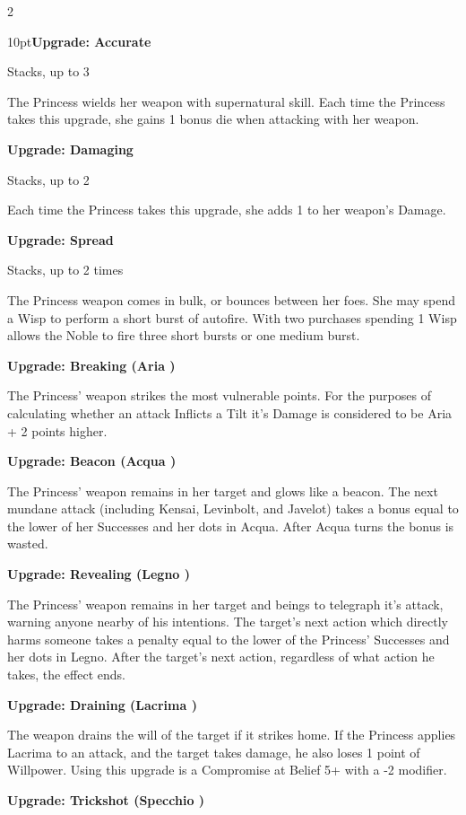 \begin{multicols}{2}
\begin{myindentpar}{10pt}\textbf{Upgrade: Accurate}

Stacks, up to 3

The Princess wields her weapon with supernatural skill. Each time the Princess takes this upgrade, she gains 1 bonus die when attacking with her weapon.

\textbf{Upgrade: Damaging}

Stacks, up to 2

Each time the Princess takes this upgrade, she adds 1 to her weapon’s Damage. 

\textbf{Upgrade: Spread}

Stacks, up to 2 times

The Princess weapon comes in bulk, or bounces between her foes. She may spend a Wisp to perform a short burst of autofire. With two purchases spending 1 Wisp allows the Noble to fire three short bursts or one medium burst. 

\textbf{Upgrade: Breaking (Aria \textbullet\textbullet)}

The Princess' weapon strikes the most vulnerable points. For the purposes of calculating whether an attack Inflicts a Tilt it's Damage is considered to be Aria + 2 points higher. 

\textbf{Upgrade: Beacon (Acqua \textbullet\textbullet)}

The Princess' weapon remains in her target and glows like a beacon. The next mundane attack (including Kensai, Levinbolt, and Javelot) takes a bonus equal to the lower of her Successes and her dots in Acqua. After Acqua turns the bonus is wasted. 

\textbf{Upgrade: Revealing (Legno \textbullet\textbullet)}

The Princess' weapon remains in her target and beings to telegraph it's attack, warning anyone nearby of his intentions. The target's next action which directly harms someone takes a penalty equal to the lower of the Princess' Successes and her dots in Legno. After the target's next action, regardless of what action he takes, the effect ends. 

\textbf{Upgrade: Draining (Lacrima \textbullet\textbullet)}

The weapon drains the will of the target if it strikes home. If the Princess applies Lacrima to an attack, and the target takes damage, he also loses 1 point of Willpower. Using this upgrade is a Compromise at Belief 5+ with a -2 modifier.

\textbf{Upgrade: Trickshot (Specchio \textbullet\textbullet)}


\end{myindentpar}
\end{multicols}
